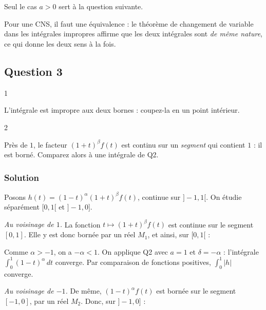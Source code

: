 \documentclass[11pt,a4paper]{article}
\newcommand{\equationajustee}[1]{%
  \sbox{\boiteequation}{$\displaystyle #1$}%
  \ifdim\wd\boiteequation>\linewidth
    \[\resizebox{\linewidth}{!}{\usebox{\boiteequation}}\]%
  \else
    \[#1\]%
  \fi}
\begin{document}
Seul le cas \(a>0\) sert à la question suivante.

\begin{methode}

Pour une CNS, il faut une équivalence : le théorème de changement de variable dans les intégrales impropres affirme que les deux intégrales sont \emph{de même nature}, ce qui donne les deux sens à la fois.

\end{methode}

\hypertarget{question-3}{%
\subsection{Question 3}\label{question-3}}

\begin{indication}{1}

L'intégrale est impropre aux deux bornes : coupez-la en un point intérieur.

\end{indication}

\begin{indication}{2}

Près de \(1\), le facteur \((1+t)^\beta f(t)\) est continu sur un \emph{segment} qui contient \(1\) : il est borné. Comparez alors à une intégrale de Q2.

\end{indication}

\hypertarget{solution-2}{%
\subsubsection{Solution}\label{solution-2}}

Posons \(h(t)=(1-t)^\alpha(1+t)^\beta f(t)\), continue sur \(]-1,1[\). On étudie séparément \([0,1[\) et \(]-1,0]\).

\emph{Au voisinage de \(1\).} La fonction \(t\mapsto(1+t)^\beta f(t)\) est continue sur le segment \([0,1]\). Elle y est donc bornée par un réel \(M_1\), et ainsi, sur \([0,1[\) :

\equationajustee{|h(t)|\leqslant M_1(1-t)^\alpha.}

Comme \(\alpha>-1\), on a \(-\alpha<1\). On applique Q2 avec \(a=1\) et \(\delta=-\alpha\) : l'intégrale \(\int_0^1(1-t)^\alpha\,dt\) converge. Par comparaison de fonctions positives, \(\int_0^1|h|\) converge.

\emph{Au voisinage de \(-1\).} De même, \((1-t)^\alpha f(t)\) est bornée sur le segment \([-1,0]\), par un réel \(M_2\). Donc, sur \(]-1,0]\) :
\end{document}
